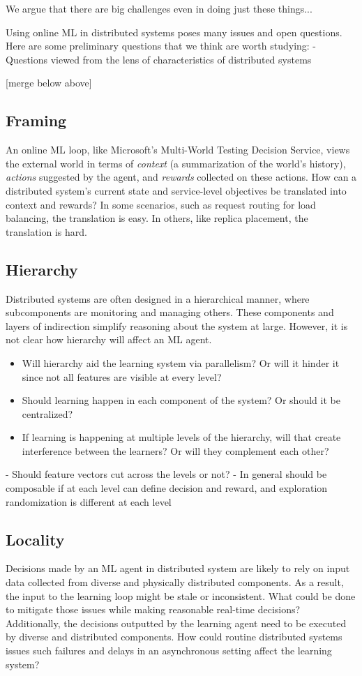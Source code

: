 \documentclass[a4paper,twocolumn]{article}
\begin{document}
We argue that there are big challenges even in doing just these things...

Using online ML in distributed systems poses many issues and open questions.
Here are some preliminary questions that we think are worth studying:
- Questions viewed from the lens of characteristics of distributed systems

[merge below above]

\subsection*{Framing}
An online ML loop, like Microsoft's Multi-World Testing Decision Service, views
the external world in terms of \emph{context} (a summarization of the world's
history), \emph{actions} suggested by the agent, and \emph{rewards} collected on
these actions. How can a distributed system's current state and service-level
objectives be translated into context and rewards? In some scenarios, such as
request routing for load balancing, the translation is easy. In others, like
replica placement, the translation is hard.

\subsection*{Hierarchy}
Distributed systems are often designed in a hierarchical manner, where
subcomponents are monitoring and managing others. These components and layers of
indirection simplify reasoning about the system at large. However, it is not
clear how hierarchy will affect an ML agent.
\begin{itemize}
  \item Will hierarchy aid the learning system via parallelism? Or will it hinder
    it since not all features are visible at every level?
  \item Should learning happen in each component of the system? Or should it be
    centralized?
  \item If learning is happening at multiple levels of the hierarchy, will that
    create interference between the learners? Or will they complement each
    other?
\end{itemize}

- Should feature vectors cut across the levels or not?
- In general should be composable if at each level can define decision and reward,
and exploration randomization is different at each level

\subsection*{Locality}
Decisions made by an ML agent in distributed system are likely to rely on input
data collected from diverse and physically distributed components. As a result,
the input to the learning loop might be stale or inconsistent. What could be
done to mitigate those issues while making reasonable real-time decisions?
Additionally, the decisions outputted by the learning agent need to be executed
by diverse and distributed components. How could routine distributed systems
issues such failures and delays in an asynchronous setting affect the learning
system?
\end{document}
